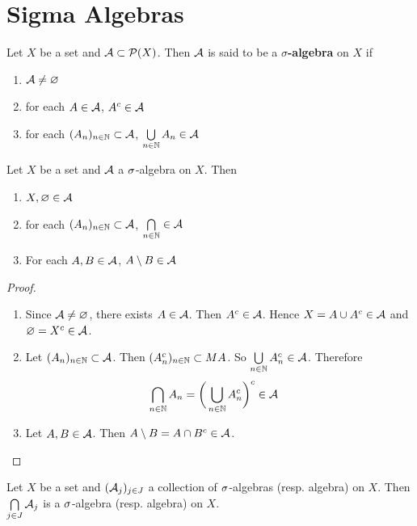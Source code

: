 \documentclass{book}
\begin{document}
	\newpage
	\section{Sigma Algebras}
		
	\begin{defn}  
		Let $X$ be a set and $\mathcal{A} \subset \mathcal{P}(X)$. Then $\mathcal{A}$ is said to be a $\sigma$\textbf{-algebra} on $X$ if 
		\begin{enumerate}
			\item $\mathcal{A} \neq \varnothing$
			\item for each $A \in \mathcal{A}$, $A^c \in \mathcal{A}$
			\item for each $(A_n)_{n \in \mathbb{N}} \subset \mathcal{A}$, $\bigcup\limits_{n \in \mathbb{N}}A_n \in \mathcal{A}$
		\end{enumerate}
	\end{defn}
	
	\begin{ex}  
		Let $X$ be a set and $\mathcal{A}$ a $\sigma$-algebra on $X$. Then 
		\begin{enumerate}
			\item $X, \varnothing \in \mathcal{A}$
			\item for each $(A_n)_{n \in \mathbb{N}} \subset \mathcal{A}$, $\bigcap\limits_{n \in \mathbb{N}} \in \mathcal{A}$
			\item For each $A, B \in \mathcal{A}$, $A \setminus B \in \mathcal{A}$  
		\end{enumerate}
	\end{ex}
	
	\begin{proof}\
		\begin{enumerate}
			\item Since $\mathcal{A} \neq \varnothing$, there exists $A \in \mathcal{A}$. Then $A^c \in \mathcal{A}$. Hence $X = A \cup A^c \in \mathcal{A}$ and $\varnothing = X^c \in \mathcal{A}$.
			\item Let $(A_n)_{n \in \mathbb{N}} \subset \mathcal{A}$. Then $(A_n^c)_{n \in \mathbb{N}} \subset MA$. So $\bigcup\limits_{n \in \mathbb{N}}A_n^c \in \mathcal{A}$. Therefore \begin{align*}
				\bigcap\limits_{n \in \mathbb{N}}A_n 
				&= \bigg(\bigcup\limits_{n \in \mathbb{N}}A_n^c\bigg)^c \in \mathcal{A}
			\end{align*}
			\item Let $A,B \in \mathcal{A}$. Then $A \setminus B = A \cap B^c \in \mathcal{A}$. 
		\end{enumerate}
	\end{proof}
	
	\begin{ex}  
		Let $X$ be a set and $(\mathcal{A}_j)_{j \in J}$ a collection of $\sigma$-algebras (resp. algebra) on $X$. Then $\bigcap\limits_{j \in J}\mathcal{A}_j$ is a $\sigma$-algebra (resp. algebra) on $X$.
	\end{ex}
	
\end{document}

